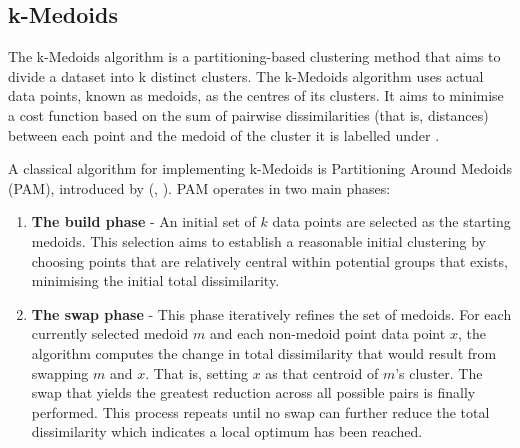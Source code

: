 \documentclass[10pt,oneside]{report}
\renewcommand{\citet}[1]{\citeauthor{#1}, \citeyear{#1}}
\begin{document}

\subsection{k-Medoids}\label{sec:kmedoids}
The k-Medoids algorithm is a partitioning-based clustering method that aims to divide a dataset into k distinct clusters. The k-Medoids algorithm uses actual data points, known as medoids, as the centres of its clusters. It aims to minimise a cost function based on the sum of pairwise dissimilarities (that is, distances) between each point and the medoid of the cluster it is labelled under \cite{kmedoids}.

A classical algorithm for implementing k-Medoids is Partitioning Around Medoids (PAM), introduced by (\citet{kmedoids}). PAM operates in two main phases:

\begin{enumerate}
    \item \textbf{The build phase} - An initial set of $k$ data points are selected as the starting medoids. This selection aims to establish a reasonable initial clustering by choosing points that are relatively central within potential groups that exists, minimising the initial total dissimilarity.
    \item \textbf{The swap phase} - This phase iteratively refines the set of medoids. For each currently selected medoid $m$ and each non-medoid point data point $x$, the algorithm computes the change in total dissimilarity that would result from swapping $m$ and $x$. That is, setting $x$ as that centroid of $m$'s cluster. The swap that yields the greatest reduction across all possible pairs is finally performed. This process repeats until no swap can further reduce the total dissimilarity which indicates a local optimum has been reached.
\end{enumerate}
\end{document}
